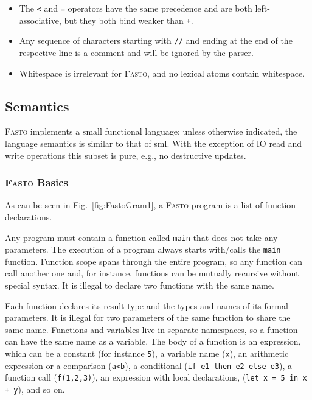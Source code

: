 \documentclass[a4paper,11pt]{article}
\newcommand{\fasto}{\textsc{Fasto}\xspace}
\begin{document}
\begin{itemize}
\item The {\tt <} and {\tt =} operators have the same precedence and 
   are both left-associative, but they both bind weaker than {\tt +}.




\item Any sequence of characters starting with {\tt //} and ending at the 
	end of the respective line is a comment and will be ignored by the parser.

  \item Whitespace is irrelevant for \fasto, and no lexical atoms 
  	contain whitespace.

\end{itemize}

\subsection{Semantics}

\fasto implements a small functional language;
unless otherwise indicated, the language semantics is similar to 
that of {\sc sml}.  With the exception of IO read and write 
operations this subset is pure, e.g., no destructive updates.

\subsubsection{\fasto Basics}

As can be seen in Fig.~\ref{fig:FastoGram1},
a \fasto program is a list of function declarations.

\noindent
Any program must contain a function called \texttt{main} that does
not take any parameters.
The execution of a program always starts with/calls the 
{\tt main} function. Function scope spans through the entire 
program, so any function can call  another one and, for instance, 
functions can be mutually recursive without special syntax. It is illegal
to declare two functions with the same name.   

Each function declares its result type and the types and names of
its formal parameters. It is illegal for two parameters
of the same function to share the same name. Functions and variables
live in separate namespaces, so a function can have the same name as a 
variable. The body
of a function is an expression, which can be a constant (for instance {\tt 5}),
a variable name ({\tt x}), an arithmetic expression or a comparison ({\tt a<b}), 
a conditional ({\tt if e1 then e2 else e3}), a function call ({\tt f(1,2,3)}), 
an expression with local declarations, ({\tt let x = 5 in x + y}), and so on.   
\end{document}

